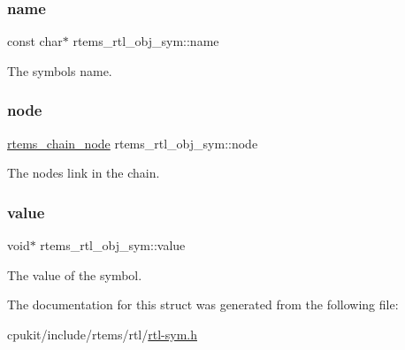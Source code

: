 \subsubsection{\texorpdfstring{name}{name}}
{\footnotesize\ttfamily const char$\ast$ rtems\+\_\+rtl\+\_\+obj\+\_\+sym\+::name}

The symbol\textquotesingle{}s name. \mbox{\label{structrtems__rtl__obj__sym_a7a7b0fe458c7c27ade5d67b1ca317eee}} 
\subsubsection{\texorpdfstring{node}{node}}
{\footnotesize\ttfamily \mbox{\hyperlink{structChain__Node__struct}{rtems\+\_\+chain\+\_\+node}} rtems\+\_\+rtl\+\_\+obj\+\_\+sym\+::node}

The node\textquotesingle{}s link in the chain. \mbox{\label{structrtems__rtl__obj__sym_ab5237d93c4e94f0949e96500126d0332}} 
\subsubsection{\texorpdfstring{value}{value}}
{\footnotesize\ttfamily void$\ast$ rtems\+\_\+rtl\+\_\+obj\+\_\+sym\+::value}

The value of the symbol. 

The documentation for this struct was generated from the following file\+:\begin{DoxyCompactItemize}
\item 
cpukit/include/rtems/rtl/\mbox{\hyperlink{rtl-sym_8h}{rtl-\/sym.\+h}}\end{DoxyCompactItemize}
